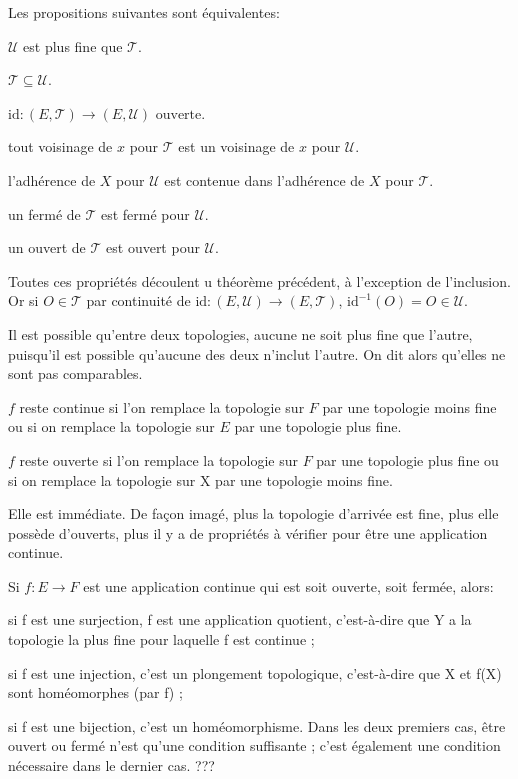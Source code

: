 \documentclass[a4paper, 11pt, french]{book}
\newenvironment{itemise}{\itemize}{\enditemize}
\theoremstyle{plain} %
\theoremstyle{definition} %
\theoremstyle{remark} %
\newcommand{\1}{\mathds{1}}
\newcommand{\id}{\mathrm{id}}
\newcommand{\inv}[1]{#1^{-1}}
\begin{document}
\proposition
Les propositions suivantes sont équivalentes:
\begin{itemise}
	\item $\mathscr{U}$ est plus fine que $\mathscr{T}$.
	\item $\mathscr{T}\subseteq\mathscr{U}$.
	\item $\id\colon(E, \mathscr{T})\rightarrow(E, \mathscr{U})\text{ ouverte}$.
	\item tout voisinage de $x$ pour $\mathscr{T}$ est un voisinage de $x$ pour $\mathscr{U}$.
	\item l'adhérence de $X$ pour $\mathscr{U}$ est contenue dans l'adhérence de $X$ pour $\mathscr{T}$.
	\item un fermé de $\mathscr{T}$ est fermé pour $\mathscr{U}$.
	\item un ouvert de $\mathscr{T}$ est ouvert pour $\mathscr{U}$.
\end{itemise}

\demonstration
Toutes ces propriétés découlent u théorème précédent, à l'exception de l'inclusion.
Or si $O\in\mathscr{T}$ par continuité de $\id\colon(E, \mathscr{U})\rightarrow(E, \mathscr{T})$, $\inv{\id}(O)=O\in\mathscr{U}$.

\remarque
Il est possible qu'entre deux topologies, aucune ne soit plus fine que l'autre, puisqu'il est possible qu'aucune des deux n'inclut l'autre.
On dit alors qu'elles ne sont pas comparables.

\proposition
\begin{itemise}
	\item $f$ reste continue si l'on remplace la topologie sur $F$ par une topologie moins fine ou si on remplace la topologie sur $E$ par une topologie plus fine.
	\item $f$ reste ouverte si l'on remplace la topologie sur $F$ par une topologie plus fine ou si on remplace la topologie sur X par une topologie moins fine.
\end{itemise}

\demonstration
Elle est immédiate.
De façon imagé, plus la topologie d'arrivée est fine, plus elle possède d'ouverts, plus il y a de propriétés à vérifier pour être une application continue.

\proposition
Si $f\colon E\rightarrow F$ est une application continue qui est soit ouverte, soit fermée, alors:
\begin{itemise}
	\item si f est une surjection, f est une application quotient, c'est-à-dire que Y a la topologie la plus fine pour laquelle f est continue ;
	\item si f est une injection, c'est un plongement topologique, c'est-à-dire que X et f(X) sont homéomorphes (par f) ;
	\item si f est une bijection, c'est un homéomorphisme.
\end{itemise}
Dans les deux premiers cas, être ouvert ou fermé n'est qu'une condition suffisante ; c'est également une condition nécessaire dans le dernier cas.
\demonstration
{\color{red} ???}
\end{document}
